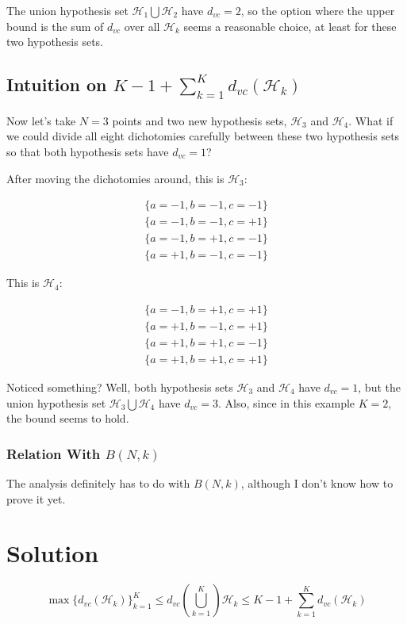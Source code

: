 \documentclass{article}
\begin{document}
The union hypothesis set $\mathcal{H}_1\bigcup\mathcal{H}_2$ have $d_{vc}=2$,
so the option where the upper bound is the sum of $d_{vc}$ over all
$\mathcal{H}_k$ seems a reasonable choice, at least for these two hypothesis
sets.

\subsection{Intuition on $K-1+\sum_{k=1}^Kd_{vc}(\mathcal{H}_k)$}

Now let's take $N=3$ points and two new hypothesis sets,
$\mathcal{H}_3$ and $\mathcal{H}_4$. What if we could divide all eight
dichotomies carefully between these two hypothesis sets so that both
hypothesis sets have $d_{vc}=1$?

After moving the dichotomies around, this is $\mathcal{H}_3$:

\begin{equation*}
\begin{split}
\{a=-1, b=-1, c=-1\} \\
\{a=-1, b=-1, c=+1\} \\
\{a=-1, b=+1, c=-1\} \\
\{a=+1, b=-1, c=-1\}
\end{split}
\end{equation*}

This is $\mathcal{H}_4$:

\begin{equation*}
\begin{split}
\{a=-1, b=+1, c=+1\} \\
\{a=+1, b=-1, c=+1\} \\
\{a=+1, b=+1, c=-1\} \\
\{a=+1, b=+1, c=+1\}
\end{split}
\end{equation*}

Noticed something? Well, both hypothesis sets $\mathcal{H}_3$ and
$\mathcal{H}_4$ have $d_{vc}=1$, but the union hypothesis set
$\mathcal{H}_3\bigcup\mathcal{H}_4$ have $d_{vc}=3$. Also, since in this
example $K=2$, the bound seems to hold.

\subsubsection{Relation With $B(N,k)$}

The analysis definitely has to do with $B(N, k)$, although I don't know how
to prove it yet.

\section{Solution}

$$
\max\{d_{vc}(\mathcal{H}_k)\}_{k=1}^K \leq d_{vc}(\bigcup _{k=1}^K)\mathcal{H}_k \leq K-1+\sum_{k=1}^Kd_{vc}(\mathcal{H}_k)
$$
\end{document}

